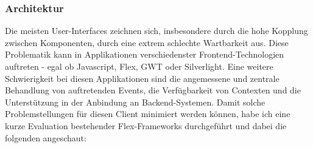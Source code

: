 \subsubsection{Architektur}
Die meisten User-Interfaces zeichnen sich, insbesondere durch die hohe Kopplung zwischen Komponenten, durch eine extrem schlechte Wartbarkeit aus. Diese Problematik kann in Applikationen verschiedenster Frontend-Technologien auftreten - egal ob Javascript, Flex, GWT oder Silverlight. Eine weitere Schwierigkeit bei diesen Applikationen sind die angemessene und zentrale Behandlung von auftretenden Events, die Verf\"ugbarkeit von Contexten und die Unterst\"utzung in der Anbindung an Backend-Systemen. Damit solche Problemstellungen f\"ur diesen Client minimiert werden k\"onnen, habe ich eine kurze Evaluation bestehender Flex-Frameworks durchgef\"uhrt und dabei die folgenden angeschaut:
